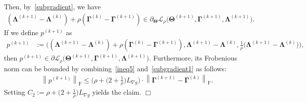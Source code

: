 \documentclass[alpha-refs]{wiley-article}
\begin{document}
Then, by~\eqref{subgradient}, we have
\begin{align*}
    (\boldsymbol{\Lambda}^{(k+1)} - \boldsymbol{\Lambda}^{(k)}) + \rho (\boldsymbol{\Gamma}^{(k)} - \boldsymbol{\Gamma}^{(k+1)} )
    \in \partial_{\boldsymbol{\Theta}}\mathcal{L}_{\rho} \big( \boldsymbol{\Theta}^{(k+1)},\boldsymbol{\Gamma}^{(k+1)},\boldsymbol{\Lambda}^{(k+1)} \big).
\end{align*}
If we define $p^{(k+1)}$ as
\begin{align} \label{subgradient1}
    p^{(k+1)}
    &:=\bigg( (\boldsymbol{\Lambda}^{(k+1)} - \boldsymbol{\Lambda}^{(k)}) + \rho (\boldsymbol{\Gamma}^{(k)} - \boldsymbol{\Gamma}^{(k+1)} ),
    \boldsymbol{\Lambda}^{(k+1)} - \boldsymbol{\Lambda}^{(k)}, \frac{1}{\rho} \big( \boldsymbol{\Lambda}^{(k+1)} - \boldsymbol{\Lambda}^{(k)} \big) \bigg),
\end{align}
then $p^{(k+1)}\in\partial \mathcal{L}_{\rho} \big( \boldsymbol{\Theta}^{(k+1)},\boldsymbol{\Gamma}^{(k+1)},\boldsymbol{\Lambda}^{(k+1)} \big)$.
Furthermore, its Frobenious norm can be bounded by combining~\eqref{ineq5} and~\eqref{subgradient1} as follows:
\begin{align*}
    \left\| p^{(k+1)} \right\|_{\text{F}} \leq
    \bigg( \rho + \big(2+\frac{1}{\rho}\big)L_{\nabla g} \bigg) \cdot
    \left\| \boldsymbol{\Gamma}^{(k+1)} - \boldsymbol{\Gamma}^{(k)} \right\|_{\text{F}}.
\end{align*}
Setting $C_{2}:=\rho + \big(2+\frac{1}{\rho}\big)L_{\nabla g}$ yields the claim.
\qquad \qquad \qquad \qquad \qquad \qquad \qquad \qquad \qquad \qquad \qquad \qquad \qquad \qquad \qquad \qquad $\Box$

\end{document}
